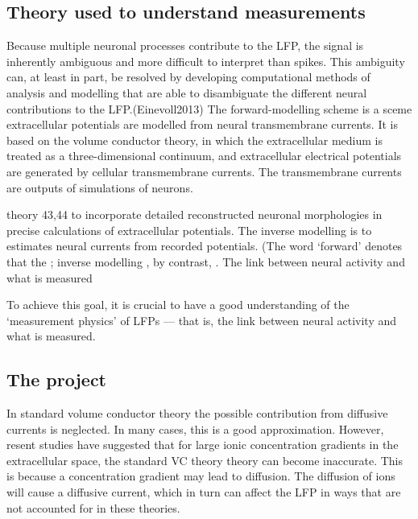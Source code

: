 \documentclass{article}
\begin{document}
\subsection{Theory used to understand measurements}

Because multiple neuronal processes contribute to the LFP, the signal is inherently ambiguous and more difficult to interpret than spikes. This ambiguity can, at least in part, be resolved by developing computational methods of analysis and modelling that are able to disambiguate the different
neural contributions to the LFP.(Einevoll2013)  The forward-modelling scheme is a sceme extracellular potentials are modelled from neural
transmembrane currents. It is based on the volume conductor theory, in which the extracellular medium is treated as a
three-dimensional continuum, and extracellular electrical potentials are
generated by cellular transmembrane currents. The transmembrane currents are outputs of simulations of neurons.

theory 43,44 to incorporate detailed reconstructed neuronal morphologies in precise
calculations of extracellular potentials. The inverse modelling is to estimates neural currents from recorded potentials. (The word ‘forward’ denotes that
the ; inverse modelling , by contrast,
.
 The link between neural activity and what is measured

To achieve this goal, it is crucial to have a good
understanding of the ‘measurement physics’ of LFPs
— that is, the link between neural activity and what is
measured.

\subsection{The project}
In standard volume conductor theory the possible contribution from diffusive currents is neglected. In many cases, this is a good approximation. However, resent studies have suggested that for large ionic concentration gradients in the extracellular space, the standard VC theory theory can become inaccurate. This is because a concentration gradient may lead to diffusion. The diffusion of ions will cause a diffusive current, which in turn can affect the LFP in ways that are not accounted for in these theories.  
\end{document}
